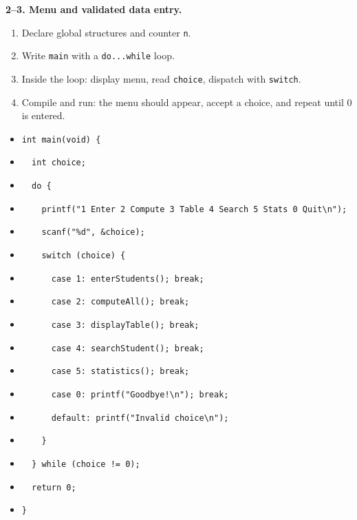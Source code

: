 \documentclass[11pt]{article}
\begin{document}
\textbf{2--3. Menu and validated data entry.}

\begin{methode}
\begin{enumerate}
\item Declare global structures and counter \texttt{n}.
\item Write \texttt{main} with a \texttt{do...while} loop.
\item Inside the loop: display menu, read \texttt{choice}, dispatch with \texttt{switch}.
\item Compile and run: the menu should appear, accept a choice, and repeat until 0 is entered.
\end{enumerate}
\end{methode}

\begin{itemize}
\item \texttt{int main(void) \{}
\item \texttt{\ \ int choice;}
\item \texttt{\ \ do \{}
\item \texttt{\ \ \ \ printf("1 Enter 2 Compute 3 Table 4 Search 5 Stats 0 Quit\textbackslash{}n");}
\item \texttt{\ \ \ \ scanf("\%d", \&choice);}
\item \texttt{\ \ \ \ switch (choice) \{}
\item \texttt{\ \ \ \ \ \ case 1: enterStudents(); break;}
\item \texttt{\ \ \ \ \ \ case 2: computeAll(); break;}
\item \texttt{\ \ \ \ \ \ case 3: displayTable(); break;}
\item \texttt{\ \ \ \ \ \ case 4: searchStudent(); break;}
\item \texttt{\ \ \ \ \ \ case 5: statistics(); break;}
\item \texttt{\ \ \ \ \ \ case 0: printf("Goodbye!\textbackslash{}n"); break;}
\item \texttt{\ \ \ \ \ \ default: printf("Invalid choice\textbackslash{}n");}
\item \texttt{\ \ \ \ \}}
\item \texttt{\ \ \} while (choice != 0);}
\item \texttt{\ \ return 0;}
\item \texttt{\}}
\end{itemize}
\end{document}
